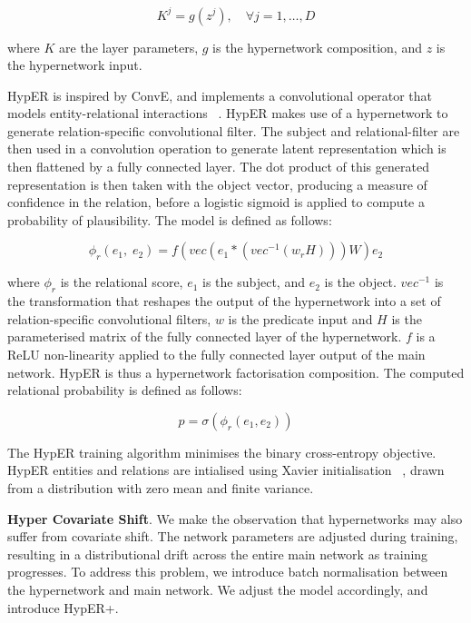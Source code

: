 \begin{equation}
	K^j = g(z^j), \quad \forall j = 1, \dots, D
\end{equation}

where $K$ are the layer parameters, $g$ is the hypernetwork composition, and $z$ is the hypernetwork input. \bigskip

HypER is inspired by ConvE, and implements a convolutional operator that models entity-relational interactions ~\citep{balazevic2019hypernetwork}. HypER makes use of a hypernetwork to generate relation-specific convolutional filter. The subject and relational-filter are then used in a convolution operation to generate latent representation which is then flattened by a fully connected layer. The dot product of this generated representation is then taken with the object vector, producing a measure of confidence in the relation, before a logistic sigmoid is applied to compute a probability of plausibility. The model is defined as follows: 

\begin{equation}
	\phi_r(e_1, \; e_2) = f(vec(e_1 * (vec^{-1}(w_rH)))W)e_2
\end{equation}

where $\phi_r$ is the relational score, $e_1$ is the subject, and $e_2$ is the object. $vec^{-1}$ is the transformation that reshapes the output of the hypernetwork into a set of relation-specific convolutional filters, $w$ is the predicate input and $H$ is the parameterised matrix of the fully connected layer of the hypernetwork. $f$ is a ReLU non-linearity applied to the fully connected layer output of the main network. HypER is thus a hypernetwork factorisation composition. The computed relational probability is defined as follows: 

\begin{equation}
	p = \sigma(\phi_r(e_1,e_2)) 
\end{equation}

The HypER training algorithm minimises the binary cross-entropy objective. HypER entities and relations are intialised using Xavier initialisation ~\citep{glorot2010understanding}, drawn from a distribution with zero mean and finite variance. \newpage

\textbf{Hyper Covariate Shift}. We make the observation that hypernetworks may also suffer from covariate shift. The network parameters are adjusted during training, resulting in a distributional drift across the entire main network as training progresses. To address this problem, we introduce batch normalisation between the hypernetwork and main network. We adjust the model accordingly, and introduce HypER+. \bigskip 

